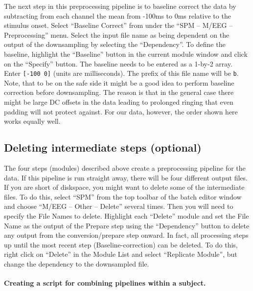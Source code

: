 The next step in this preprocessing pipeline is to baseline correct the data by subtracting from each channel the mean from -100ms to 0ms relative to the stimulus onset. Select ``Baseline Correct'' from under the ``SPM -- M/EEG -- Preprocessing'' menu. Select the input file name as being dependent on the output of the downsampling by selecting the ``Dependency''. To define the baseline, highlight the ``Baseline'' button in the current module window and click on the ``Specify'' button. The baseline needs to be entered as a 1-by-2 array. Enter \texttt{[-100 0]} (units are milliseconds). The prefix of this file name will be \texttt{b}. Note, that to be on the safe side it might be a good idea to perform baseline correction before downsampling. The reason is that in the general case there might be large DC offsets in the data leading to prolonged ringing that even padding will not protect against. For our data, however, the order shown here works equally well.

\subsection{Deleting intermediate steps (optional)}

The four steps (modules) described above create a preprocessing pipeline for the data. If this pipeline is run straight away, there will be four different output files. If you are short of diskspace, you might want to delete some of the intermediate files. To do this, select ``SPM'' from the top toolbar of the batch editor window and choose ``M/EEG -- Other -- Delete'' several times. Then you will need to specify the File Names to delete. Highlight each ``Delete'' module and set the File Name as the output of the Prepare step using the ``Dependency'' button to delete any output from the conversion/prepare step onward. In fact, all processing steps up until the most recent step (Baseline-correction) can be deleted. To do this, right click on ``Delete'' in the Module List and select ``Replicate Module'', but change the dependency to the downsampled file. 

\paragraph{Creating a script for combining pipelines within a subject.}

